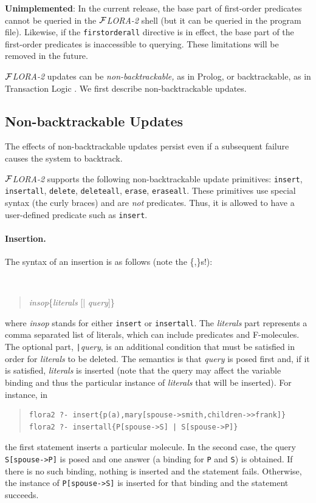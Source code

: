 \documentclass[11pt]{article}
\newcommand{\FLORA}{{\mbox{${\cal F}${\small\it LORA}\rm\emph{-2}}}\xspace}
\begin{document}
{\bf Unimplemented}: In the current release, the base part of first-order
predicates cannot be queried in the \FLORA shell (but it can be queried in
the program file).  Likewise, if the {\tt firstorderall} directive is in
effect, the base part of the first-order predicates is inaccessible to
querying.  These limitations will be removed in the future.


\FLORA updates can be \emph{non-backtrackable,} as in Prolog,
or backtrackable, as in Transaction Logic \cite{trans-tcs94}.
We first describe non-backtrackable updates.


\subsection{Non-backtrackable Updates} \label{sec:non-backtrackable-updates}

%
The effects of non-backtrackable updates persist even if a subsequent failure
causes the system to backtrack.

\FLORA supports the following non-backtrackable update primitives:
{\tt insert}, {\tt insertall}, {\tt delete}, {\tt deleteall},
{\tt erase}, {\tt eraseall}. These primitives use special syntax (the curly
braces) and are \emph{not} predicates. Thus, it is allowed to have a
user-defined predicate such as {\tt insert}.

%
\paragraph{Insertion.} The syntax of an insertion is as follows (note the
\{,\}s!):
{\tt
\begin{quote}
\emph{insop}\{\emph{literals} [| \emph{query}]\}
\end{quote}
}
where {\it insop} stands for either {\tt insert} or {\tt insertall}.
The
{\it literals} part represents a comma separated list of literals,
which can include
predicates and \mbox{F-molecules}. The optional part, {\tt |}{\it query},
is an additional condition that must be satisfied in order for
\emph{literals} to be deleted.
The semantics is that \emph{query} is posed first and, if it is
satisfied, \emph{literals} is inserted (note that the query may affect the
variable binding and thus the particular instance of \emph{literals} that
will be inserted). For instance, in
\begin{quote}
\begin{verbatim}
flora2 ?- insert{p(a),mary[spouse->smith,children->>frank]}
flora2 ?- insertall{P[spouse->S] | S[spouse->P]}
\end{verbatim}
\end{quote}
the first statement inserts a particular molecule. In the second case, the
query {\tt S[spouse->P]} is posed and one answer (a binding for {\tt P} and
{\tt S}) is obtained. If there is no such binding, nothing is inserted and
the statement fails. Otherwise, the instance of {\tt P[spouse->S]} is
inserted for that binding and the statement succeeds.
\end{document}
